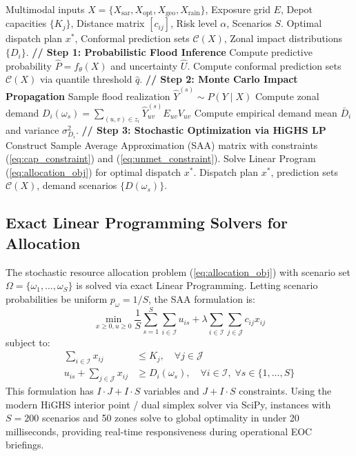 \documentclass[journal]{IEEEtran}
\begin{document}
\begin{algorithm}[t]
\caption{ResQ-AI End-to-End Operational Pipeline}
\label{alg:pipeline}
\begin{algorithmic}[1]
\REQUIRE Multimodal inputs $X = \{X_{\text{sar}}, X_{\text{opt}}, X_{\text{geo}}, X_{\text{rain}}\}$, Exposure grid $E$, Depot capacities $\{K_j\}$, Distance matrix $[c_{ij}]$, Risk level $\alpha$, Scenarios $S$.
\ENSURE Optimal dispatch plan $x^*$, Conformal prediction sets $\mathcal{C}(X)$, Zonal impact distributions $\{D_i\}$.
\STATE \textbf{// Step 1: Probabilistic Flood Inference}
\STATE Compute predictive probability $\hat{P} = f_\theta(X)$ and uncertainty $\hat{U}$.
\STATE Compute conformal prediction sets $\mathcal{C}(X)$ via quantile threshold $\hat{q}$.
\STATE \textbf{// Step 2: Monte Carlo Impact Propagation}
    \STATE Sample flood realization $\hat{Y}^{(s)} \sim P(Y \mid X)$
        \STATE Compute zonal demand $D_i(\omega_s) = \sum_{(u,v) \in z_i} \hat{Y}_{uv}^{(s)} E_{uv} V_{uv}$
    \ENDFOR
\ENDFOR
\STATE Compute empirical demand mean $\bar{D}_i$ and variance $\sigma_{D_i}^2$.
\STATE \textbf{// Step 3: Stochastic Optimization via HiGHS LP}
\STATE Construct Sample Average Approximation (SAA) matrix with constraints (\ref{eq:cap_constraint}) and (\ref{eq:unmet_constraint}).
\STATE Solve Linear Program (\ref{eq:allocation_obj}) for optimal dispatch $x^*$.
\RETURN Dispatch plan $x^*$, prediction sets $\mathcal{C}(X)$, demand scenarios $\{D(\omega_s)\}$.
\end{algorithmic}
\end{algorithm}

\subsection{Exact Linear Programming Solvers for Allocation}
The stochastic resource allocation problem (\ref{eq:allocation_obj}) with scenario set $\Omega = \{\omega_1, \dots, \omega_S\}$ is solved via exact Linear Programming. Letting scenario probabilities be uniform $p_\omega = 1/S$, the SAA formulation is:
\begin{equation}
\min_{x \ge 0, u \ge 0} \frac{1}{S} \sum_{s=1}^S \sum_{i \in \mathcal{I}} u_{is} + \lambda \sum_{i \in \mathcal{I}} \sum_{j \in \mathcal{J}} c_{ij} x_{ij}
\end{equation}
subject to:
\begin{align}
\sum_{i \in \mathcal{I}} x_{ij} &\le K_j, \quad \forall j \in \mathcal{J} \\
u_{is} + \sum_{j \in \mathcal{J}} x_{ij} &\ge D_i(\omega_s), \quad \forall i \in \mathcal{I}, \; \forall s \in \{1, \dots, S\}
\end{align}
This formulation has $I \cdot J + I \cdot S$ variables and $J + I \cdot S$ constraints. Using the modern HiGHS interior point / dual simplex solver via SciPy, instances with $S = 200$ scenarios and 50 zones solve to global optimality in under 20 milliseconds, providing real-time responsiveness during operational EOC briefings.
\end{document}
